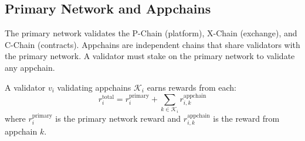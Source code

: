 \subsection{Primary Network and Appchains}

The primary network validates the P-Chain (platform), X-Chain (exchange), and C-Chain (contracts). Appchains are independent chains that share validators with the primary network. A validator must stake on the primary network to validate any appchain.

\begin{definition}
A validator $v_i$ validating appchains $\mathcal{K}_i$ earns rewards from each:
\begin{equation}
    r_i^{\text{total}} = r_i^{\text{primary}} + \sum_{k \in \mathcal{K}_i} r_{i,k}^{\text{appchain}}
\end{equation}
where $r_i^{\text{primary}}$ is the primary network reward and $r_{i,k}^{\text{appchain}}$ is the reward from appchain $k$.
\end{definition}

